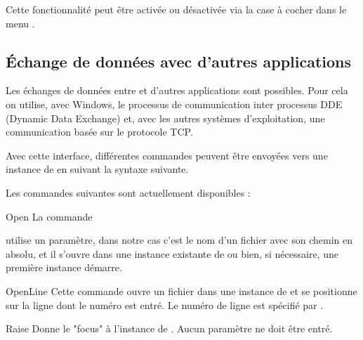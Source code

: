 
Cette fonctionnalité peut être activée ou désactivée via la case à cocher  dans le menu .


\subsection{Échange de données avec d'autres applications}

Les échanges de données entre \codeblocks et d'autres applications sont possibles. Pour cela on utilise, avec Windows, le processus de communication inter processus DDE (Dynamic Data Exchange) et, avec les autres systèmes d'exploitation, une communication basée sur le protocole TCP.

Avec cette interface, différentes commandes peuvent être envoyées vers une instance de \codeblocks en suivant la syntaxe suivante.

\begin{code}
\end{code}

Les commandes suivantes sont actuellement disponibles :

\begin{codeentry}
\item[Open] La commande

\begin{code}
\end{code}

utilise un paramètre, dans notre cas c'est le nom d'un fichier avec son chemin en absolu, et il s'ouvre dans une instance existante de \codeblocks ou bien, si nécessaire, une première instance démarre.
\item[OpenLine] Cette commande ouvre un fichier dans une instance de \codeblocks et se positionne sur la ligne dont le numéro est entré. Le numéro de ligne est spécifié par .

\begin{code}
\end{code}

\item[Raise] Donne le "focus" à l'instance de \codeblocks. Aucun paramètre ne doit être entré.
\end{codeentry}

